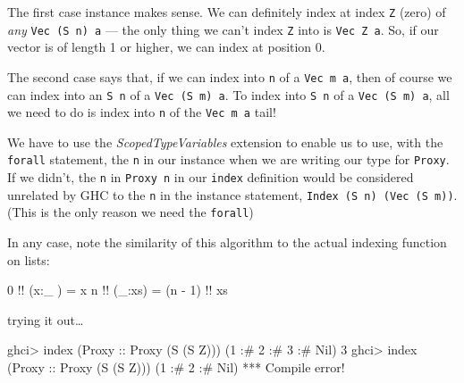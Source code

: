 \documentclass[]{article}
\newenvironment{Shaded}{}{}
\newcommand{\DataTypeTok}[1]{\textcolor[rgb]{0.56,0.13,0.00}{#1}}
\newcommand{\DecValTok}[1]{\textcolor[rgb]{0.25,0.63,0.44}{#1}}
\newcommand{\FunctionTok}[1]{\textcolor[rgb]{0.02,0.16,0.49}{#1}}
\newcommand{\NormalTok}[1]{#1}
\newcommand{\OperatorTok}[1]{\textcolor[rgb]{0.40,0.40,0.40}{#1}}
\newcommand{\OtherTok}[1]{\textcolor[rgb]{0.00,0.44,0.13}{#1}}
\begin{document}
The first case instance makes sense. We can definitely index at index \texttt{Z}
(zero) of \emph{any} \texttt{Vec\ (S\ n)\ a} --- the only thing we can't index
\texttt{Z} into is \texttt{Vec\ Z\ a}. So, if our vector is of length 1 or
higher, we can index at position 0.

The second case says that, if we can index into \texttt{n} of a
\texttt{Vec\ m\ a}, then of course we can index into an \texttt{S\ n} of a
\texttt{Vec\ (S\ m)\ a}. To index into \texttt{S\ n} of a
\texttt{Vec\ (S\ m)\ a}, all we need to do is index into \texttt{n} of the
\texttt{Vec\ m\ a} tail!

We have to use the \emph{ScopedTypeVariables} extension to enable us to use,
with the \texttt{forall} statement, the \texttt{n} in our instance when we are
writing our type for \texttt{Proxy}. If we didn't, the \texttt{n} in
\texttt{Proxy\ n} in our \texttt{index} definition would be considered unrelated
by GHC to the \texttt{n} in the instance statement,
\texttt{Index\ (S\ n)\ (Vec\ (S\ m))}. (This is the only reason we need the
\texttt{forall})

In any case, note the similarity of this algorithm to the actual indexing
function on lists:

\begin{Shaded}
\begin{Highlighting}[]
\DecValTok{0} \OperatorTok{!!}\NormalTok{ (x}\OperatorTok{:}\NormalTok{\_ ) }\OtherTok{=}\NormalTok{ x}
\NormalTok{n }\OperatorTok{!!}\NormalTok{ (\_}\OperatorTok{:}\NormalTok{xs) }\OtherTok{=}\NormalTok{ (n }\OperatorTok{{-}} \DecValTok{1}\NormalTok{) }\OperatorTok{!!}\NormalTok{ xs}
\end{Highlighting}
\end{Shaded}

trying it out\ldots{}

\begin{Shaded}
\begin{Highlighting}[]
\NormalTok{ghci}\OperatorTok{>} \FunctionTok{index}\NormalTok{ (}\DataTypeTok{Proxy}\OtherTok{ ::} \DataTypeTok{Proxy}\NormalTok{ (}\DataTypeTok{S}\NormalTok{ (}\DataTypeTok{S} \DataTypeTok{Z}\NormalTok{))) (}\DecValTok{1} \OperatorTok{:\#} \DecValTok{2} \OperatorTok{:\#} \DecValTok{3} \OperatorTok{:\#} \DataTypeTok{Nil}\NormalTok{)}
\DecValTok{3}
\NormalTok{ghci}\OperatorTok{>} \FunctionTok{index}\NormalTok{ (}\DataTypeTok{Proxy}\OtherTok{ ::} \DataTypeTok{Proxy}\NormalTok{ (}\DataTypeTok{S}\NormalTok{ (}\DataTypeTok{S} \DataTypeTok{Z}\NormalTok{))) (}\DecValTok{1} \OperatorTok{:\#} \DecValTok{2} \OperatorTok{:\#} \DataTypeTok{Nil}\NormalTok{)}
\OperatorTok{***} \DataTypeTok{Compile} \FunctionTok{error}\OperatorTok{!}
\end{Highlighting}
\end{Shaded}
\end{document}
